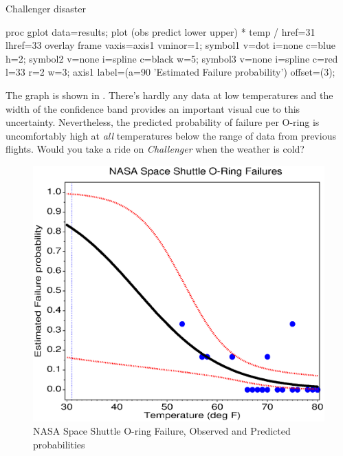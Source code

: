 \begin{Example}[nasa]{Challenger disaster}
\begin{listing}
proc gplot data=results;
   plot (obs predict lower upper) * temp /
      href=31 lhref=33
      overlay frame vaxis=axis1 vminor=1;
   symbol1 v=dot i=none c=blue h=2;
   symbol2 v=none i=spline c=black w=5;
   symbol3 v=none i=spline c=red l=33 r=2 w=3;
   axis1 label=(a=90 'Estimated Failure probability') offset=(3);
\end{listing}

The graph is shown in .  There's hardly any data
at low temperatures and the width of the confidence band provides
an important visual cue to this uncertainty. Nevertheless,
the predicted probability of failure per O-ring is uncomfortably
 high at \emph{all} temperatures below the range of data from
previous flights.  Would you take a ride on \emph{Challenger} when
the weather is cold?

\begin{figure}[htb]
  \centering
  \includegraphics[scale=.75]{ch6/fig/nasa}
  \caption{NASA Space Shuttle O-ring Failure, Observed and Predicted probabilities}\label{fig:nasa}
\end{figure}
\end{Example}
